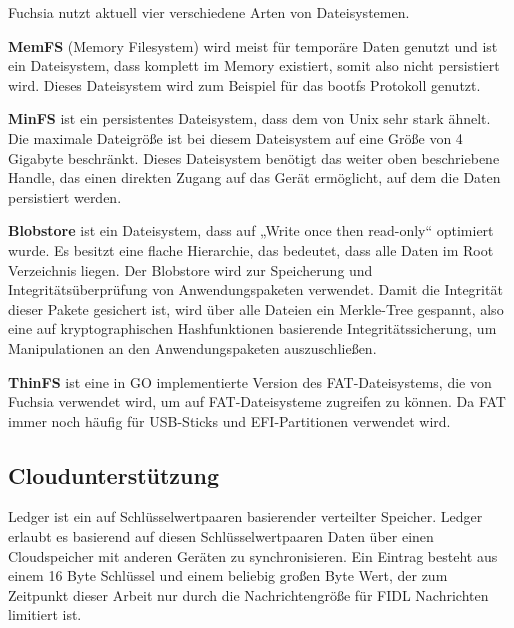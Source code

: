 \documentclass[a4paper]{scrartcl}
\begin{document}
Fuchsia nutzt aktuell vier verschiedene Arten von Dateisystemen.\cite{Fuchsia.Storage}

\textbf{MemFS} (Memory Filesystem) wird meist für temporäre Daten genutzt und ist ein Dateisystem, dass komplett im Memory existiert, somit also nicht persistiert wird. Dieses Dateisystem wird zum Beispiel für das bootfs Protokoll genutzt.

\textbf{MinFS} ist ein persistentes Dateisystem, dass dem von Unix sehr stark ähnelt. Die maximale Dateigröße ist bei diesem Dateisystem auf eine Größe von 4 Gigabyte beschränkt. Dieses Dateisystem benötigt das weiter oben beschriebene Handle, das einen direkten Zugang auf das Gerät ermöglicht, auf dem die Daten persistiert werden.

\textbf{Blobstore} ist ein Dateisystem, dass auf „Write once then read-only“ optimiert wurde. Es besitzt eine flache Hierarchie, das bedeutet, dass alle Daten im Root Verzeichnis liegen. Der Blobstore wird zur Speicherung und Integritätsüberprüfung von Anwendungspaketen verwendet. Damit die Integrität dieser Pakete gesichert ist, wird über alle Dateien ein Merkle-Tree gespannt, also eine auf kryptographischen Hashfunktionen basierende Integritätssicherung, um Manipulationen an den Anwendungspaketen auszuschließen.

\textbf{ThinFS} ist eine in GO implementierte Version des FAT-Dateisystems, die von Fuchsia verwendet wird, um auf FAT-Dateisysteme zugreifen zu können. Da FAT immer noch häufig für USB-Sticks und EFI-Partitionen verwendet wird.
\subsection{Cloudunterstützung}
\label{sec:Ledger}
Ledger ist ein auf Schlüsselwertpaaren basierender verteilter Speicher. Ledger erlaubt es basierend auf diesen Schlüsselwertpaaren Daten über einen Cloudspeicher mit anderen Geräten zu synchronisieren. Ein Eintrag besteht aus einem 16 Byte Schlüssel und einem beliebig großen Byte Wert, der zum Zeitpunkt dieser Arbeit nur durch die Nachrichtengröße für FIDL Nachrichten limitiert ist.
\end{document}
